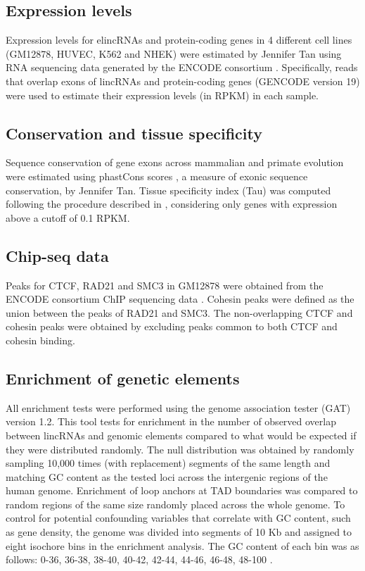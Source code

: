 \documentclass[11pt,a4paper]{report}
\begin{document}
\subsection*{Expression levels}

Expression levels for elincRNAs and protein-coding genes in 4  different cell lines (GM12878, HUVEC, K562 and NHEK) were estimated by Jennifer Tan using RNA sequencing data generated by the ENCODE consortium \cite{ENCODEProject2012}. Specifically, reads that overlap exons of lincRNAs and protein-coding genes (GENCODE version 19) were used to estimate their expression levels (in RPKM) in each sample.

\subsection*{Conservation and tissue specificity}

Sequence conservation of gene exons across mammalian and primate evolution were estimated using phastCons scores \cite{Siepel2005}⁠, a measure of exonic sequence conservation, by Jennifer Tan. Tissue specificity index (Tau) was computed following the procedure described in \cite{Kryuchkova2015a}, considering only genes with expression above a cutoff of 0.1 RPKM.

\subsection*{Chip-seq data}

Peaks for CTCF, RAD21 and SMC3 in GM12878 were obtained from the ENCODE consortium ChIP sequencing data \cite{ENCODEProject2012}⁠. Cohesin peaks were defined as the union between the peaks of RAD21 and SMC3. The non-overlapping CTCF and cohesin peaks were obtained by excluding peaks common to both CTCF and cohesin binding.

\subsection*{Enrichment of genetic elements}

All enrichment tests were performed using the genome association tester (GAT)⁠ version 1.2. This tool tests for enrichment in the number of observed overlap between lincRNAs and genomic elements compared to what would be expected if they were distributed randomly. The null distribution was obtained by randomly sampling 10,000 times (with replacement) segments of the same length and matching GC content as the tested loci across the intergenic regions of the human genome. Enrichment of loop anchors at TAD boundaries was compared to random regions of the same size randomly placed across the whole genome. To control for potential confounding variables that correlate with GC content, such as gene density, the genome was divided into segments of 10 Kb and assigned to eight isochore bins in the enrichment analysis. The GC content of each bin was as follows: 0-36, 36-38, 38-40, 40-42, 42-44, 44-46, 46-48, 48-100 \cite{Heger2013}. 
\end{document}
